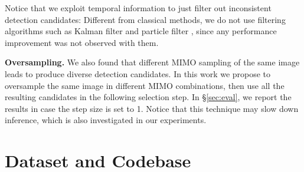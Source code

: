 \documentclass{bmvc2k}
\begin{document}
Notice that we exploit temporal information to just filter out inconsistent detection candidates:
Different from classical methods, we do not use filtering algorithms such as Kalman filter \cite{yu+2003icme,yu+2003icme2,yu+2003acmmm,yu+2004icip,zaveri+2004icme,kittler+2005ia,liang+2005pcm,chen+2006cesa,ren+2006eccvw,yu+2006tmm,yu+2007icme,yu+2007vcip,kim+2009cgiv,chakraborty+2013indicon} and particle filter \cite{yan+2005bmvc,abed+2006acivs,ariki+2008icme,huang+2008icpr,zhu+2008civr,beetz+2009ijcss,zhu+2009tmm}, since any performance improvement was not observed with them.
\par
\vspace{1mm}
\noindent \textbf{Oversampling.}
We also found that different MIMO sampling of the same image leads to produce diverse detection candidates.
In this work we propose to oversample the same image in different MIMO combinations, then use all the resulting candidates in the following selection step.
In \S \ref{sec:eval}, we report the results in case the step size is set to 1.
Notice that this technique may slow down inference, which is also investigated in our experiments.
\section{Dataset and Codebase}
\label{sec:dataset}
\end{document}

